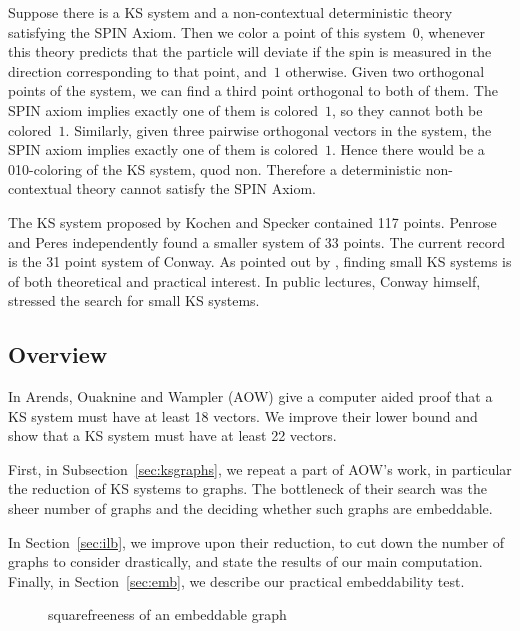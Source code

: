 \documentclass[adraft,copyright,creativecommons]{eptcs}
\newcounter{main}
\theoremstyle{definition}
\theoremstyle{remark}
\begin{document}
Suppose there is a KS system and a non-contextual deterministic theory satisfying
the SPIN Axiom.
Then we color a point of this system~$0$,
whenever this theory predicts that the particle will deviate
if the spin is measured in the direction corresponding to that
point, and~$1$ otherwise.
Given two orthogonal points of the system,
we can find a third point orthogonal to both of them.
The SPIN axiom implies exactly one of them is colored~$1$, so they
cannot both be colored~$1$.
Similarly, given three pairwise orthogonal vectors in the system,
the SPIN axiom implies exactly one of them is colored~$1$.
Hence there would be a 010-coloring of the KS system, quod non.
Therefore a deterministic non-contextual theory cannot satisfy the
SPIN Axiom.

The KS system proposed by Kochen and Specker contained 117 points\cite{ks}.
Penrose and Peres\cite{peres} independently found a smaller system of 33 points.
The current record is the 31 point system of Conway\cite[p.~197]{qtcm}.
As pointed out by \cite{c00,aow11}, finding small KS systems
is of both theoretical and practical interest.
In public lectures, Conway himself, stressed the search for small KS
systems.\cite{OC}

\subsection{Overview}
In \cite{aow11} Arends, Ouaknine and Wampler (AOW) give a computer aided proof
that a KS system must have at least 18 vectors.  We improve their lower bound
and show that a KS system must have at least 22 vectors.

First, in Subsection~\ref{sec:ksgraphs},
we repeat a part of AOW's work, in particular the reduction of
KS systems to graphs.
The bottleneck of their search was the sheer number of graphs
and the deciding whether such graphs are embeddable.

In Section~\ref{sec:ilb},
we improve upon their reduction,
to cut down the number of graphs to consider drastically,
and state the results of our main computation.
Finally, in Section~\ref{sec:emb},
we describe our practical embeddability test.

\begin{figure}
\begin{center}
\end{center}
\caption{squarefreeness of an embeddable graph
\label{fig:crossproduct}}
\end{figure}
\end{document}
